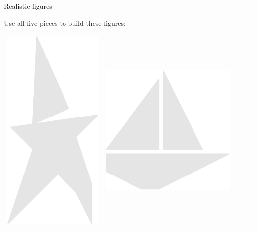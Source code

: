 \documentclass[14pt]{beamer}
\begin{document}
    \begin{frame}{Realistic figures}
        \vspace{-1em}
        \begin{center}
            \quad Use all five pieces to build these figures:

            \vspace{-0.8em}
            
            {\footnotesize
            \begin{tabular}{ccccc}
                \includegraphics[scale=0.21]{figures/figure026aa.pdf}&
                \includegraphics[scale=0.21]{figures/figure026c.pdf} &

\end{tabular}}
\end{center}
\end{frame}
\end{document}
